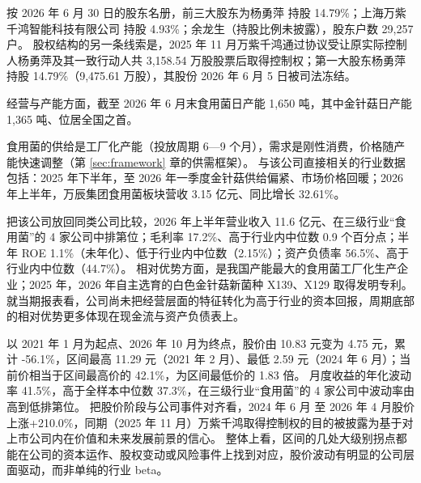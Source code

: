  按 2026 年 6 月 30 日的股东名册，前三大股东为杨勇萍 持股 14.79\%；上海万紫千鸿智能科技有限公司 持股 4.93\%；余龙生（持股比例未披露），股东户数 29,257 户。 股权结构的另一条线索是，2025 年 11 月万紫千鸿通过协议受让原实际控制人杨勇萍及其一致行动人共 3,158.54 万股股票后取得控制权；第一大股东杨勇萍持股 14.79\%（9,475.61 万股），其股份 2026 年 6 月 5 日被司法冻结。

 经营与产能方面，截至 2026 年 6 月末食用菌日产能 1,650 吨，其中金针菇日产能 1,365 吨、位居全国之首。

 食用菌的供给是工厂化产能（投放周期 6---9 个月），需求是刚性消费，价格随产能快速调整（第 \ref{sec:framework} 章的供需框架）。 与该公司直接相关的行业数据包括：2025 年下半年，至 2026 年一季度金针菇供给偏紧、市场价格回暖；2026 年上半年，万辰集团食用菌板块营收 3.15 亿元、同比增长 32.61\%。

 把该公司放回同类公司比较，2026 年上半年营业收入 11.6 亿元、在三级行业“食用菌”的 4 家公司中排第位；毛利率 17.2\%、高于行业内中位数 0.9 个百分点；半年 ROE 1.1\%（未年化）、低于行业内中位数（2.15\%）；资产负债率 56.5\%、高于行业内中位数（44.7\%）。 相对优势方面，是我国产能最大的食用菌工厂化生产企业；2025 年，2026 年自主选育的白色金针菇新菌种 X139、X129 取得发明专利。 就当期报表看，公司尚未把经营层面的特征转化为高于行业的资本回报，周期底部的相对优势更多体现在现金流与资产负债表上。

 以 2021 年 1 月为起点、2026 年 10 月为终点，股价由 10.83 元变为 4.75 元，累计 -56.1\%，区间最高 11.29 元（2021 年 2 月）、最低 2.59 元（2024 年 6 月）；当前价相当于区间最高价的 42.1\%，为区间最低价的 1.83 倍。 月度收益的年化波动率 41.5\%，高于全样本中位数 37.3\%，在三级行业“食用菌”的 4 家公司中波动率由高到低排第位。 把股价阶段与公司事件对齐看，2024 年 6 月 至 2026 年 4 月股价上涨+210.0\%，同期（2025 年 11 月）万紫千鸿取得控制权的目的被披露为基于对上市公司内在价值和未来发展前景的信心。 整体上看，区间的几处大级别拐点都能在公司的资本运作、股权变动或风险事件上找到对应，股价波动有明显的公司层面驱动，而非单纯的行业 beta。

